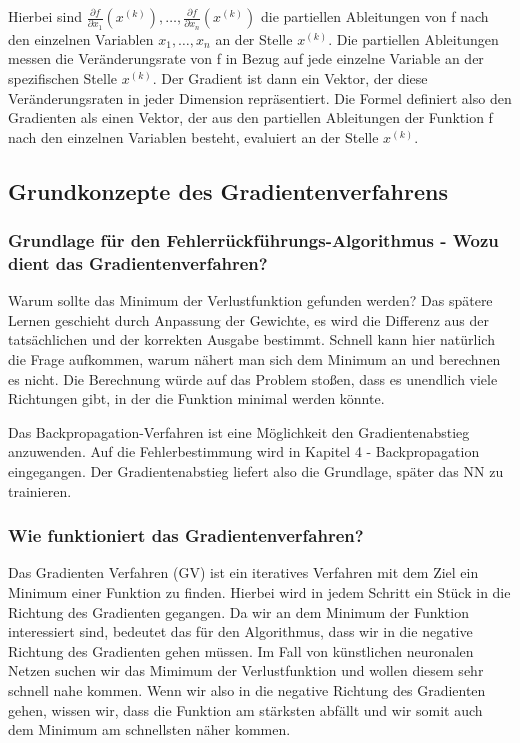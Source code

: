   Hierbei sind $\frac{\partial f}{\partial x_{1}}(x^{(k)}), \dots, \frac{\partial f}{\partial x_{n}}(x^{(k)})$ die partiellen Ableitungen von f nach den einzelnen Variablen $x_{1}, \ldots, x_{n}$ an der Stelle $x^(k)$.
  Die partiellen Ableitungen messen die Veränderungsrate von f in Bezug auf jede einzelne Variable an der spezifischen Stelle $x^(k)$. Der Gradient ist dann ein Vektor, der diese Veränderungsraten in jeder Dimension repräsentiert.
  Die Formel definiert also den Gradienten als einen Vektor, der aus den partiellen Ableitungen der Funktion f nach den einzelnen Variablen besteht, evaluiert an der Stelle 
  $x^(k)$.

\subsection{Grundkonzepte des Gradientenverfahrens}\label{subsec:gradientenverfahren:grundkonzepte}
\subsubsection{Grundlage für den Fehlerrückführungs-Algorithmus - Wozu dient das Gradientenverfahren?}\label{subsec:gradientenverfahren:grundlage_fehlerrueckfuehrungsalg}
  Warum sollte das Minimum der Verlustfunktion gefunden werden? Das spätere Lernen geschieht durch Anpassung der Gewichte, es wird die Differenz aus der tatsächlichen und der korrekten Ausgabe bestimmt. 
  Schnell kann hier natürlich die Frage aufkommen, warum nähert man sich dem Minimum an und berechnen es nicht. Die Berechnung würde auf das Problem stoßen, dass es unendlich viele Richtungen gibt, in der die Funktion minimal werden könnte. 

  Das Backpropagation-Verfahren ist eine Möglichkeit den Gradientenabstieg anzuwenden. Auf die Fehlerbestimmung wird in Kapitel 4 - Backpropagation eingegangen. Der Gradientenabstieg liefert also die Grundlage, später das NN zu trainieren.

\subsubsection{Wie funktioniert das Gradientenverfahren?}\label{subsec:gradientenverfahren:wie_funktioniert}
Das Gradienten Verfahren (GV) ist ein iteratives Verfahren mit dem Ziel ein Minimum einer Funktion zu finden. Hierbei wird in jedem Schritt ein Stück in die Richtung des Gradienten
gegangen. Da wir an dem Minimum der Funktion interessiert sind, bedeutet das für den Algorithmus, dass wir in die negative Richtung des Gradienten gehen müssen. \cite{LH21}
Im Fall von künstlichen neuronalen Netzen suchen wir das Mimimum der Verlustfunktion und wollen diesem sehr schnell nahe kommen.
Wenn wir also in die negative Richtung des Gradienten gehen, wissen wir, dass die Funktion am stärksten abfällt und wir somit auch dem Minimum am schnellsten näher kommen.


